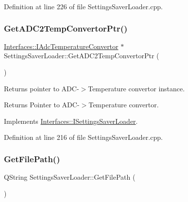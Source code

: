 Definition at line 226 of file Settings\+Saver\+Loader.\+cpp.

\mbox{\label{class_settings_saver_loader_aa1265b1e9431bf3b611e5b45b4782700}} 
\subsubsection{\texorpdfstring{Get\+A\+D\+C2\+Temp\+Convertor\+Ptr()}{GetADC2TempConvertorPtr()}}
{\footnotesize\ttfamily \hyperlink{class_interfaces_1_1_i_adc_temperature_convertor}{Interfaces\+::\+I\+Adc\+Temperature\+Convertor} $\ast$ Settings\+Saver\+Loader\+::\+Get\+A\+D\+C2\+Temp\+Convertor\+Ptr (\begin{DoxyParamCaption}{ }\end{DoxyParamCaption})\hspace{0.3cm}{\ttfamily [virtual]}}



Returns pointer to A\+D\+C-\/$>$Temperature convertor instance. 

\begin{DoxyReturn}{Returns}
Pointer to A\+D\+C-\/$>$Temperature convertor. 
\end{DoxyReturn}


Implements \hyperlink{class_interfaces_1_1_i_settings_saver_loader_a44d68d2bc7de1717bc41ee264db13ac5}{Interfaces\+::\+I\+Settings\+Saver\+Loader}.



Definition at line 216 of file Settings\+Saver\+Loader.\+cpp.

\mbox{\label{class_settings_saver_loader_a006a6350a00ffc18ec544616e504ccf7}} 
\subsubsection{\texorpdfstring{Get\+File\+Path()}{GetFilePath()}}
{\footnotesize\ttfamily Q\+String Settings\+Saver\+Loader\+::\+Get\+File\+Path (\begin{DoxyParamCaption}{ }\end{DoxyParamCaption})\hspace{0.3cm}{\ttfamily [virtual]}}



